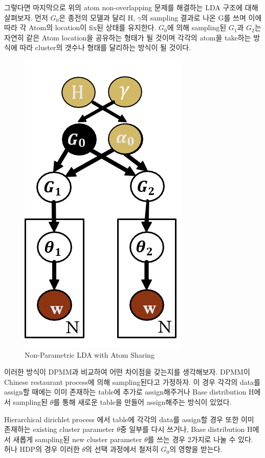 \documentclass[a4paper]{oblivoir}
\begin{document}
그렇다면 마지막으로 위의 atom non-overlapping 문제를 해결하는 LDA 구조에 대해 살펴보자. 먼저 $G_{0}$은 종전의 모델과 달리 H, $\gamma$의 sampling 결과로 나온 G를 쓰며 이에 따라 각 Atom의 location이 fix된 상태를 유지한다. $G_{0}$에 의해 sampling된 $G_{1}$과 $G_{2}$는 자연히 같은 Atom location을 공유하는 형태가 될 것이며 각각의 atom을 take하는 방식에 따라 cluster의 갯수나 형태를 달리하는 방식이 될 것이다.
\begin{figure}[ht] \centering 
\begin{center}
\includegraphics[scale=0.6]{fig13_13.png} 
\caption{Non-Parametric LDA with Atom Sharing}
\label{fig:13-15}
\end{center}
\end{figure}

이러한 방식이 DPMM과 비교하여 어떤 차이점을 갖는지를 생각해보자.
DPMM이 Chinese restaurant process에 의해 sampling된다고 가정하자. 이 경우 각각의 data를 assign할 때에는 이미 존재하는 table에 추가로 assign해주거나 Base distribution H에서 sampling된 $\theta$를 통해 새로운 table을 만들어 assign해주는 방식이 있었다. 

Hierarchical dirichlet process 에서 table에 각각의 data를 assign할 경우 또한 이미 존재하는 existing cluster parameter $\theta$중 일부를 다시 쓰거나, Base distribution H에서 새롭게 sampling된 new cluster parameter $\theta$를 쓰는 경우 2가지로 나눌 수 있다. 허나 HDP의 경우 이러한 $\theta$의 선택 과정에서 철저히 $G_{0}$의 영향을 받는다. 
\end{document}
